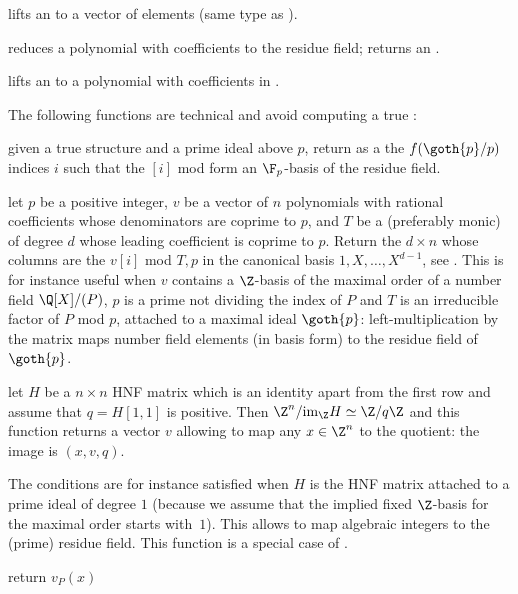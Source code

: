  lifts an  to a vector of
 elements (same type as ).

 reduces a polynomial
with  coefficients to the residue field; returns an .

 lifts an  to a polynomial
with coefficients in .

The following functions are technical and avoid computing a true
:

 given a true  structure
and a prime ideal  above $p$, return as a  the
$f(\goth{p}/p)$ indices $i$ such that the $[i]$ mod 
form an $\F_p$-basis of the residue field.

 let $p$ be a positive integer,
$v$ be a vector of $n$ polynomials with rational coefficients whose denominators
are coprime to $p$, and $T$ be a  (preferably monic) of
degree $d$ whose leading coefficient is coprime to $p$. Return the
$d \times n$  whose columns are the $v[i]$ mod $T,p$ in the
canonical basis $1, X, \dots, X^{d-1}$, see .
This is for instance useful when $v$ contains a $\Z$-basis of the maximal
order of a number field $\Q[X]/(P)$, $p$ is a prime not dividing the index of
$P$ and $T$ is an irreducible factor of $P$ mod $p$, attached to a maximal
ideal $\goth{p}$: left-multiplication by the matrix maps number field
elements (in basis form) to the residue field of~$\goth{p}$.

 let $H$ be a $n \times n$ HNF matrix which is an
identity apart from the first row and assume that $q = H[1,1]$ is positive.
Then $\Z^n / \text{im}_\Z H \simeq \Z/q\Z$ and this function returns a vector
$v$ allowing to map any $x \in \Z^n$ to the quotient: the image is
$(x, v, q)$.

The conditions are for instance satisfied when $H$ is the HNF matrix attached
to a prime ideal of degree $1$ (because we assume that the implied fixed
$\Z$-basis for the maximal order starts with~$1$). This allows to map
algebraic integers to the (prime) residue field. This function is a special
case of .


 return $v_P(x)$

